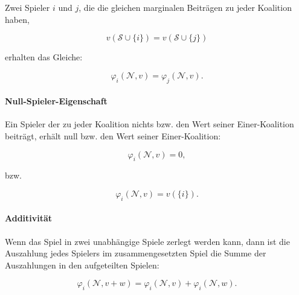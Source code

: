 Zwei Spieler $i$ und $j$, die die gleichen marginalen Beiträgen zu jeder Koalition haben,

\begin{equation*}
v(\mathcal{S} \cup \{i\}) = v(\mathcal{S} \cup \{j\})
\end{equation*}

erhalten das Gleiche:

\begin{equation*}
\varphi_i (\mathcal{N}, v) = \varphi_j (\mathcal{N}, v).
\end{equation*}

\paragraph{Null-Spieler-Eigenschaft}

Ein Spieler der zu jeder Koalition nichts bzw. den Wert seiner Einer-Koalition beiträgt, erhält null bzw. den Wert seiner Einer-Koalition:

\begin{equation*}
\varphi_i (\mathcal{N}, v) = 0,
\end{equation*}

bzw.

\begin{equation*}
\varphi_i (\mathcal{N}, v) = v(\{i\}).
\end{equation*}

\paragraph{Additivität}

Wenn das Spiel in zwei unabhängige Spiele zerlegt werden kann, dann ist die Auszahlung jedes Spielers im zusammengesetzten Spiel die Summe der Auszahlungen in den aufgeteilten Spielen:

\begin{equation*}
\varphi_i (\mathcal{N}, v + w) = \varphi_i (\mathcal{N}, v) + \varphi_i (\mathcal{N}, w).
\end{equation*}

